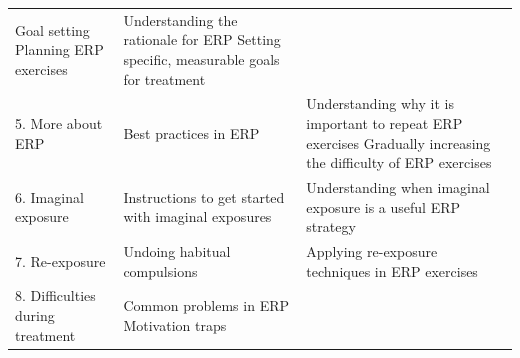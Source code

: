 \documentclass[]{book}
\begin{document}
\begin{longtable}[]{@{}lll@{}}
\begin{minipage}[t]{0.30\columnwidth}
Goal setting Planning ERP exercises\strut
\end{minipage} & \begin{minipage}[t]{0.30\columnwidth}\raggedright
Understanding the rationale for ERP Setting specific, measurable goals for treatment\strut
\end{minipage}\tabularnewline
\begin{minipage}[t]{0.30\columnwidth}\raggedright
5. More about ERP\strut
\end{minipage} & \begin{minipage}[t]{0.30\columnwidth}\raggedright
Best practices in ERP\strut
\end{minipage} & \begin{minipage}[t]{0.30\columnwidth}\raggedright
Understanding why it is important to repeat ERP exercises Gradually increasing the difficulty of ERP exercises\strut
\end{minipage}\tabularnewline
\begin{minipage}[t]{0.30\columnwidth}\raggedright
6. Imaginal exposure\strut
\end{minipage} & \begin{minipage}[t]{0.30\columnwidth}\raggedright
Instructions to get started with imaginal exposures\strut
\end{minipage} & \begin{minipage}[t]{0.30\columnwidth}\raggedright
Understanding when imaginal exposure is a useful ERP strategy\strut
\end{minipage}\tabularnewline
\begin{minipage}[t]{0.30\columnwidth}\raggedright
7. Re-exposure\strut
\end{minipage} & \begin{minipage}[t]{0.30\columnwidth}\raggedright
Undoing habitual compulsions\strut
\end{minipage} & \begin{minipage}[t]{0.30\columnwidth}\raggedright
Applying re-exposure techniques in ERP exercises\strut
\end{minipage}\tabularnewline
\begin{minipage}[t]{0.30\columnwidth}\raggedright
8. Difficulties during treatment\strut
\end{minipage} & \begin{minipage}[t]{0.30\columnwidth}\raggedright
Common problems in ERP Motivation traps\strut
\end{minipage} & \begin{minipage}[t]{0.30\columnwidth}\raggedright

\end{minipage}
\end{longtable}
\end{document}

